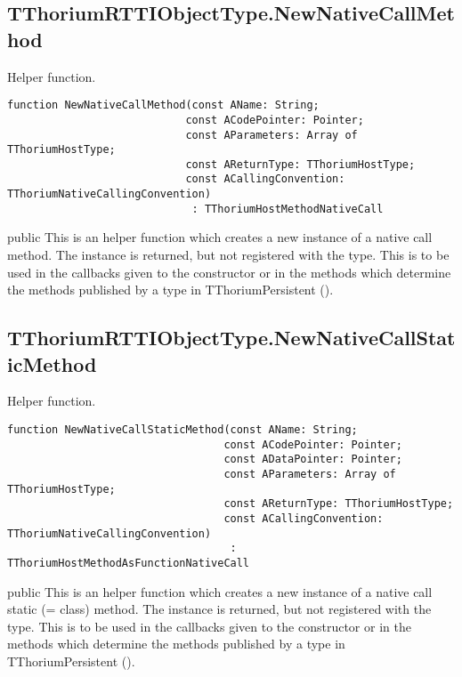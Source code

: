 \subsection{TThoriumRTTIObjectType.NewNativeCallMethod}
\label{thoriumcorepkg:thorium:tthoriumrttiobjecttype:newnativecallmethod}
\begin{FPCList}
\Synopsis
Helper function.\Declaration 

\begin{verbatim}
function NewNativeCallMethod(const AName: String;
                            const ACodePointer: Pointer;
                            const AParameters: Array of TThoriumHostType;
                            const AReturnType: TThoriumHostType;
                            const ACallingConvention: TThoriumNativeCallingConvention)
                             : TThoriumHostMethodNativeCall
\end{verbatim}
\Visibility
public
\Description
This is an helper function which creates a new instance of a native call method. The instance is returned, but not registered with the type. This is to be used in the callbacks given to the constructor or in the methods which determine the methods published by a type in TThoriumPersistent (\pageref{thoriumcorepkg:thorium:tthoriumpersistent}).\end{FPCList}
\subsection{TThoriumRTTIObjectType.NewNativeCallStaticMethod}
\label{thoriumcorepkg:thorium:tthoriumrttiobjecttype:newnativecallstaticmethod}
\begin{FPCList}
\Synopsis
Helper function.\Declaration 

\begin{verbatim}
function NewNativeCallStaticMethod(const AName: String;
                                  const ACodePointer: Pointer;
                                  const ADataPointer: Pointer;
                                  const AParameters: Array of TThoriumHostType;
                                  const AReturnType: TThoriumHostType;
                                  const ACallingConvention: TThoriumNativeCallingConvention)
                                   : TThoriumHostMethodAsFunctionNativeCall
\end{verbatim}
\Visibility
public
\Description
This is an helper function which creates a new instance of a native call static (= class) method. The instance is returned, but not registered with the type. This is to be used in the callbacks given to the constructor or in the methods which determine the methods published by a type in TThoriumPersistent (\pageref{thoriumcorepkg:thorium:tthoriumpersistent}).\end{FPCList}
